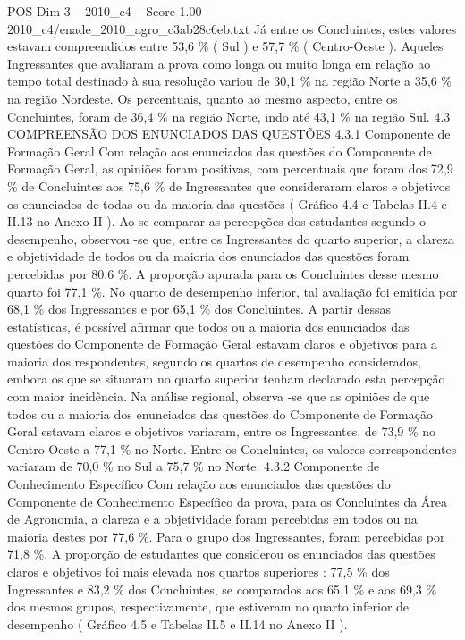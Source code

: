 \begin{textsample}{POS Dim 3 – 2010\_c4 – Score 1.00 – 2010\_c4/enade\_2010\_agro\_c3ab28c6eb.txt}
Já entre os Concluintes, estes valores estavam compreendidos entre 53,6 \% ( Sul ) e 57,7 \% ( Centro-Oeste ).
Aqueles Ingressantes que avaliaram a prova como longa ou muito longa em relação ao tempo total destinado à sua resolução variou de 30,1 \% na região Norte a 35,6 \% na região Nordeste.
Os percentuais, quanto ao mesmo aspecto, entre os Concluintes, foram de 36,4 \% na região Norte, indo até 43,1 \% na região Sul. 4.3 COMPREENSÃO DOS ENUNCIADOS DAS QUESTÕES 4.3.1 Componente de Formação Geral Com relação aos enunciados das questões do Componente de Formação Geral, as opiniões foram positivas, com percentuais que foram dos 72,9 \% de Concluintes aos 75,6 \% de Ingressantes que consideraram claros e objetivos os enunciados de todas ou da maioria das questões ( Gráfico 4.4 e Tabelas II.4 e II.13 no Anexo II ).
Ao se comparar as percepções dos estudantes segundo o desempenho, observou -se que, entre os Ingressantes do quarto superior, a clareza e objetividade de todos ou da maioria dos enunciados das questões foram percebidas por 80,6 \%.
A proporção apurada para os Concluintes desse mesmo quarto foi 77,1 \%.
No quarto de desempenho inferior, tal avaliação foi emitida por 68,1 \% dos Ingressantes e por 65,1 \% dos Concluintes.
A partir dessas estatísticas, é possível afirmar que todos ou a maioria dos enunciados das questões do Componente de Formação Geral estavam claros e objetivos para a maioria dos respondentes, segundo os quartos de desempenho considerados, embora os que se situaram no quarto superior tenham declarado esta percepção com maior incidência.
Na análise regional, observa -se que as opiniões de que todos ou a maioria dos enunciados das questões do Componente de Formação Geral estavam claros e objetivos variaram, entre os Ingressantes, de 73,9 \% no Centro-Oeste a 77,1 \% no Norte.
Entre os Concluintes, os valores correspondentes variaram de 70,0 \% no Sul a 75,7 \% no Norte. 4.3.2 Componente de Conhecimento Específico Com relação aos enunciados das questões do Componente de Conhecimento Específico da prova, para os Concluintes da Área de Agronomia, a clareza e a objetividade foram percebidas em todos ou na maioria destes por 77,6 \%.
Para o grupo dos Ingressantes, foram percebidas por 71,8 \%.
A proporção de estudantes que considerou os enunciados das questões claros e objetivos foi mais elevada nos quartos superiores : 77,5 \% dos Ingressantes e 83,2 \% dos Concluintes, se comparados aos 65,1 \% e aos 69,3 \% dos mesmos grupos, respectivamente, que estiveram no quarto inferior de desempenho ( Gráfico 4.5 e Tabelas II.5 e II.14 no Anexo II ).

\end{textsample}
